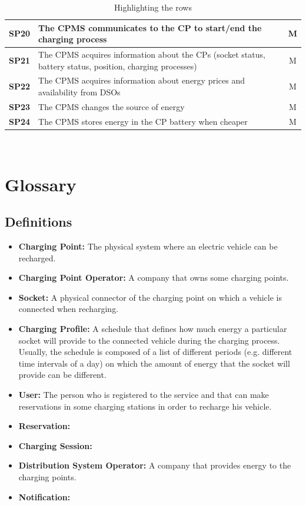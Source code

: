 \documentclass{Configuration_Files/PoliMi3i_thesis}
\begin{document}
\begin{table}[H]
\begin{tabularx}{\textwidth}{|p{3em}|X|c|}
    \hline
    \textbf{SP20} & The CPMS communicates to the CP to start/end the charging process & M\B\\
    \hline
    \textbf{SP21} & The CPMS acquires information about the CPs (socket status, battery status, position, charging processes) & M\B\\
    \hline
    \textbf{SP22} & The CPMS acquires information about energy prices and availability from DSOs & M\B\\
    \hline
    \textbf{SP23} & The CPMS changes the source of energy & M\B\\
    \hline
    \textbf{SP24} & The CPMS stores energy in the CP battery when cheaper & M\B\\
    \hline
    \end{tabularx}
    \\[10pt]
    \caption{Highlighting the rows}
    \label{table:exampleR}
\end{table}

\section{Glossary}

\subsection{Definitions}

\begin{itemize}
    \item \textbf{Charging Point:} The physical system where an electric vehicle can be recharged.
    \item \textbf{Charging Point Operator:} A company that owns some charging points.
    \item \textbf{Socket:} A physical connector of the charging point on which a vehicle is connected when recharging.
    \item \textbf{Charging Profile:} A schedule that defines how much energy a particular socket will provide to the connected vehicle during the charging process. Usually, the schedule is composed of a list of different periods (e.g. different time intervals of a day) on which the amount of energy that the socket will provide can be different.
    \item \textbf{User:} The person who is registered to the service and that can make reservations in some charging stations in order to recharge his vehicle.
    \item \textbf{Reservation:}
    \item \textbf{Charging Session:}
    \item \textbf{Distribution System Operator:} A company that provides energy to the charging points.
    \item \textbf{Notification:}
\end{itemize}
\end{document}
